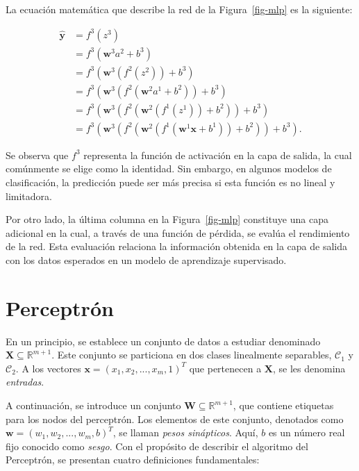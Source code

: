 \documentclass[
  us-letterpaper,
]{scrreprt}
\theoremstyle{plain}
\theoremstyle{definition}
\theoremstyle{definition}
\theoremstyle{plain}
\theoremstyle{remark}
\begin{document}
La ecuación matemática que describe la red de la Figura~\ref{fig-mlp} es
la siguiente:

\[
\begin{split}\hat{\mathbf{y}} &= f^3(z^3) \\&= f^3(\mathbf{w}^3 a^2 + b^3) \\&= f^3(\mathbf{w}^3 (f^2(z^2)) + b^3) \\&= f^3(\mathbf{w}^3 (f^2(\mathbf{w}^2 a^1 + b^2)) + b^3) \\&= f^3(\mathbf{w}^3 (f^2(\mathbf{w}^2 (f^1(z^1)) + b^2)) + b^3) \\&= f^3(\mathbf{w}^3 (f^2(\mathbf{w}^2 (f^1(\mathbf{w}^1 \mathbf{x} + b^1)) + b^2)) + b^3).\end{split}
\]

Se observa que \(f^3\) representa la función de activación en la capa de
salida, la cual comúnmente se elige como la identidad. Sin embargo, en
algunos modelos de clasificación, la predicción puede ser más precisa si
esta función es no lineal y limitadora.

Por otro lado, la última columna en la Figura~\ref{fig-mlp} constituye
una capa adicional en la cual, a través de una función de pérdida, se
evalúa el rendimiento de la red. Esta evaluación relaciona la
información obtenida en la capa de salida con los datos esperados en un
modelo de aprendizaje supervisado.

\section{Perceptrón}\label{perceptruxf3n}

En un principio, se establece un conjunto de datos a estudiar denominado
\(\mathbf X \subseteq \mathbb R^{m+1}\). Este conjunto se particiona en
dos clases linealmente separables, \(\mathscr C_1\) y \(\mathscr C_2\).
A los vectores \(\mathbf x = (x_1, x_2,...,x_m,1)^T\) que pertenecen a
\(\mathbf X\), se les denomina \emph{entradas}.

A continuación, se introduce un conjunto
\(\mathbf W \subseteq \mathbb R^{m+1}\), que contiene etiquetas para los
nodos del perceptrón. Los elementos de este conjunto, denotados como
\(\mathbf w = (w_1,w_2,...,w_m,b)^T\), se llaman \emph{pesos
sinápticos}. Aquí, \(b\) es un número real fijo conocido como
\emph{sesgo}. Con el propósito de describir el algoritmo del Perceptrón,
se presentan cuatro definiciones fundamentales:
\end{document}
